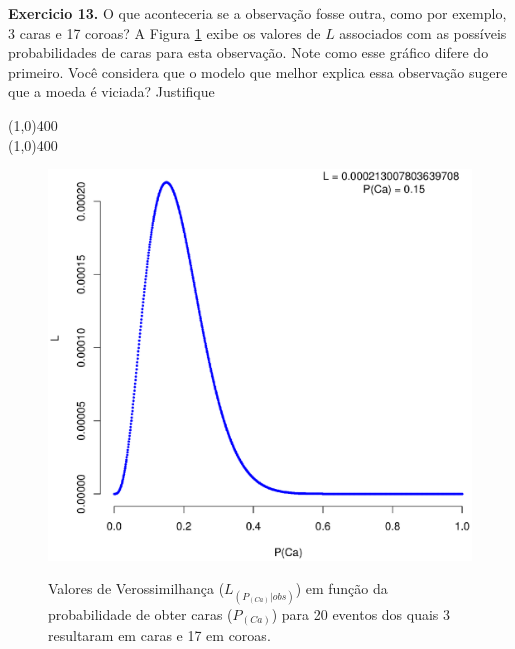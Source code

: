 \begin{refsection}
\begin{blackBlock}{\textbf{Exercicio 13.}}
O que aconteceria se a observação fosse outra, como por exemplo, 3 caras e 17 coroas? A Figura \ref{fig:plot2} exibe os valores de $L$ associados com as possíveis probabilidades de caras para esta observação. Note como esse gráfico difere do primeiro. Você considera que o modelo que melhor explica essa observação sugere que a moeda é viciada? Justifique

\end{blackBlock}

\begin{center}
\line(1,0){400}\\
\line(1,0){400}\\
\end{center}

  \begin{figure}[h!]
       \centering
      {\includegraphics[scale=0.55]{figures/tut12/plot_2.eps}}
      {\caption{Valores de Verossimilhança ($L_{(P_{(Ca)}|obs)}$) em função da probabilidade de obter caras ($P_{(Ca)}$) para 20 eventos dos quais 3 resultaram em caras e 17 em coroas.}\label{fig:plot2}}
  \end{figure}



\end{refsection}
